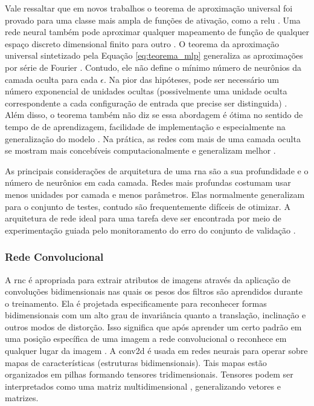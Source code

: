 Vale ressaltar que em novos trabalhos o teorema de aproximação universal foi provado para uma classe mais ampla de funções de ativação, como a \acrshort{relu} \cite{leshno1993multilayer}. Uma rede neural também pode aproximar qualquer mapeamento de função de qualquer espaço discreto dimensional finito para outro \cite{Goodfellow2016}.
O teorema da aproximação universal sintetizado pela Equação \ref{eq:teorema_mlp} generaliza as aproximações por série de Fourier \cite{Haykin}. Contudo, ele não define o mínimo número de neurônios  da camada oculta para cada $\epsilon$. Na pior das hipóteses, pode ser necessário um número exponencial de unidades ocultas (possivelmente uma unidade oculta correspondente a cada configuração de entrada que precise ser distinguida) \cite{Goodfellow2016}.
Além disso, o teorema também não diz se essa abordagem é ótima no sentido de tempo de de aprendizagem, facilidade de implementação e especialmente na generalização do modelo \cite{Haykin}. Na prática, as redes com mais de uma camada oculta se mostram mais concebíveis computacionalmente e generalizam melhor \cite{Goodfellow2016}.   

As principais considerações de arquitetura de uma \acrshort{rna} são a sua profundidade e o número de neurônios em cada camada. Redes mais profundas costumam usar  menos unidades por camada e menos parâmetros. Elas normalmente generalizam para o conjunto de testes, contudo são frequentemente difíceis de otimizar. A arquitetura de rede ideal para uma tarefa deve ser encontrada por meio de experimentação guiada pelo monitoramento do erro do conjunto de validação \cite{Goodfellow2016}.


\subsubsection{Rede Convolucional}

A \gls{rnc} é apropriada para extrair atributos de imagens através da aplicação de convoluções bidimensionais nas quais os pesos dos filtros são aprendidos durante o treinamento. Ela é projetada especificamente para reconhecer formas bidimensionais com um alto grau de invariância quanto a translação, inclinação e outros modos de distorção. Isso significa que após aprender um certo padrão em uma posição específica de uma imagem a rede convolucional o reconhece em qualquer lugar da imagem \cite{Haykin}. 
A \gls{conv2d} é usada  em redes neurais para operar sobre mapas de características (estruturas  bidimensionais). Tais mapas estão organizados em pilhas formando tensores tridimensionais. Tensores podem ser interpretados como uma matriz multidimensional \cite{geron2017hands}, generalizando vetores e matrizes.  

